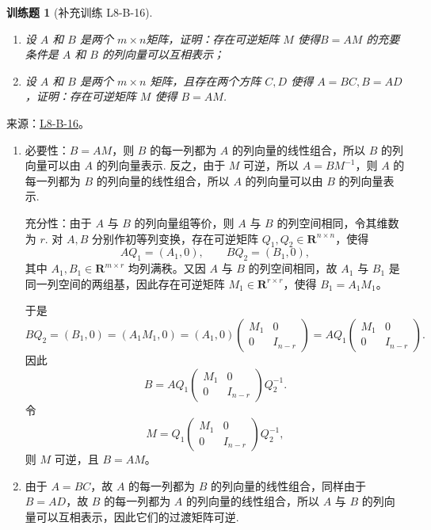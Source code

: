 \documentclass[12pt,fontset=fandol]{ctexart}
\newtheorem{exercise}{训练题}[section]
\begin{document}
\begin{exercise}[补充训练 L8-B-16]\label{prob:L8-B-16}
\begin{enumerate}
            \item 设 $A$ 和 $B$ 是两个 $m \times n$矩阵，证明：存在可逆矩阵 $M$ 使得$B = AM$ 的充要条件是 $A$ 和 $B$ 的列向量可以互相表示；
            \item 设 $A$ 和 $B$ 是两个 $m \times n$ 矩阵，且存在两个方阵 $C, D$ 使得 $A = BC, B = AD$，证明：存在可逆矩阵 $M$ 使得 $B = AM$.
        \end{enumerate}
\end{exercise}
\noindent 来源：\href{https://github.com/yhwu-is/Linear-Algebra-Left-Undone/blob/new/%E8%AE%B2%E4%B9%89/%E4%B8%93%E9%A2%98/8%20%E7%9B%B8%E6%8A%B5%E6%A0%87%E5%87%86%E5%BD%A2.tex}{L8-B-16}。
\begin{solve}
\begin{enumerate}
                \item 必要性：$B = AM$，则 $B$ 的每一列都为 $A$ 的列向量的线性组合，所以 $B$ 的列向量可以由 $A$ 的列向量表示. 反之，由于 $M$ 可逆，所以 $A = BM^{-1}$，则 $A$ 的每一列都为 $B$ 的列向量的线性组合，所以 $A$ 的列向量可以由 $B$ 的列向量表示.

                充分性：由于 $A$ 与 $B$ 的列向量组等价，则 $A$ 与 $B$ 的列空间相同，令其维数为 $r$. 对 $A, B$ 分别作初等列变换，存在可逆矩阵 $Q_1, Q_2 \in \mathbf{R}^{n\times n}$，使得
                \[ AQ_1 = (A_1, 0), \qquad BQ_2 = (B_1, 0), \]
                其中 $A_1, B_1 \in \mathbf{R}^{m\times r}$ 均列满秩。又因 $A$ 与 $B$ 的列空间相同，故 $A_1$ 与 $B_1$ 是同一列空间的两组基，因此存在可逆矩阵 $M_1 \in \mathbf{R}^{r\times r}$，使得 $B_1 = A_1M_1$。

                于是
                \[ BQ_2=(B_1,0) = (A_1M_1,0) = (A_1,0) \begin{pmatrix}
                    M_1 & 0 \\ 0 & I_{n-r}
                \end{pmatrix} = AQ_1 \begin{pmatrix}
                    M_1 & 0 \\ 0 & I_{n-r}
                \end{pmatrix}. \]
                因此
                \[ B = AQ_1 \begin{pmatrix}
                    M_1 & 0\\ 0 & I_{n-r}
                \end{pmatrix} Q_2^{-1}. \]
                令
                \[ M = Q_1 \begin{pmatrix}
                    M_1 & 0 \\ 0 & I_{n-r}
                    \end{pmatrix} Q_2^{-1}, \]
                则 $M$ 可逆，且 $B = AM$。

                \item 由于 $A = BC$，故 $A$ 的每一列都为 $B$ 的列向量的线性组合，同样由于$B = AD$，故 $B$ 的每一列都为 $A$ 的列向量的线性组合，所以 $A$ 与 $B$ 的列向量可以互相表示，因此它们的过渡矩阵可逆.
            \end{enumerate}
\end{solve}
\end{document}
